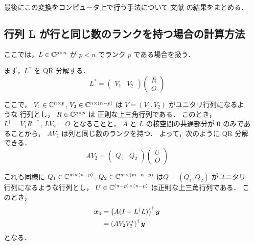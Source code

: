 最後にこの変換をコンピュータ上で行う手法について
文献 \cite{Elden1982, Hansen1994} の結果をまとめる．

\subsection{行列 L が行と同じ数のランクを持つ場合の計算方法}

ここでは，$L \in \mathbb{C}^{p \times n}$ が $p < n$ でランク $p$ である場合を扱う．

まず，$L^*$ を QR 分解する．
\begin{equation}
    L^* = \begin{pmatrix}
        V_1 & V_2
    \end{pmatrix}\begin{pmatrix}
        R \\ O
    \end{pmatrix}
\end{equation}

ここで，
$V_1 \in \mathbb{C}^{n \times p}$,
$V_2 \in \mathbb{C}^{n \times (n-p)}$
は $V = (V_1, V_2)$ がユニタリ行列になるような
行列とし，
$R \in \mathbb{C}^{p \times p}$ は
正則な上三角行列である．
このとき，$L^\dagger = V_1 R^{-*}$, $LV_2 = O$ となることと，
$A$ と $L$ の核空間の共通部分が $\bm{0}$ のみであることから，
$AV_2$ は列と同じ数のランクを持つ．
よって，次のように QR 分解できる．
\begin{equation}
    AV_2 = \begin{pmatrix}
        Q_1 & Q_2
    \end{pmatrix}\begin{pmatrix}
        U \\ O
    \end{pmatrix}
\end{equation}

これも同様に
$Q_1 \in \mathbb{C}^{m \times (n-p)}$,
$Q_2 \in \mathbb{C}^{m \times (m-n+p)}$
は$Q = (Q_1, Q_2)$ がユニタリ行列になるような行列とし，
$U \in \mathbb{C}^{(n - p) \times (n - p)}$
は正則な上三角行列である．
このとき，
\begin{align}
    \bm{x}_0 & = \left(A (I - L^\dagger L)\right)^\dagger \bm{y} \notag \\
             & = \left(A V_2 V_2^*\right)^\dagger \bm{y}
\end{align}
となる．


